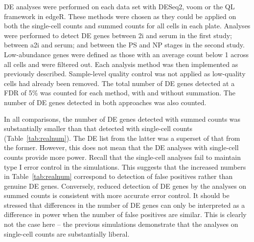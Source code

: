\documentclass{article}
\begin{document}
DE analyses were performed on each data set with DESeq2, voom or the QL framework in edgeR.
These methods were chosen as they could be applied on both the single-cell counts and summed counts for all cells in each plate. 
Analyses were performed to detect DE genes between 2i and serum in the first study; between a2i and serum; and between the PS and NP stages in the second study.
Low-abundance genes were defined as those with an average count below 1 across all cells and were filtered out.
Each analysis method was then implemented as previously described. 
Sample-level quality control was not applied as low-quality cells had already been removed.
The total number of DE genes detected at a FDR of 5\% was counted for each method, with and without summation.
The number of DE genes detected in both approaches was also counted.

In all comparisons, the number of DE genes detected with summed counts was substantially smaller than that detected with single-cell counts (Table~\ref{tab:realnum}).
The DE list from the latter was a superset of that from the former.
However, this does not mean that the DE analyses with single-cell counts provide more power.
Recall that the single-cell analyses fail to maintain type I error control in the simulations.
This suggests that the increased numbers in Table~\ref{tab:realnum} correspond to detection of false positives rather than genuine DE genes.
Conversely, reduced detection of DE genes by the analyses on summed counts is consistent with more accurate error control.
It should be stressed that differences in the number of DE genes can only be interpreted as a difference in power when the number of false positives are similar.
This is clearly not the case here -- the previous simulations demonstrate that the analyses on single-cell counts are substantially liberal.
\end{document}

